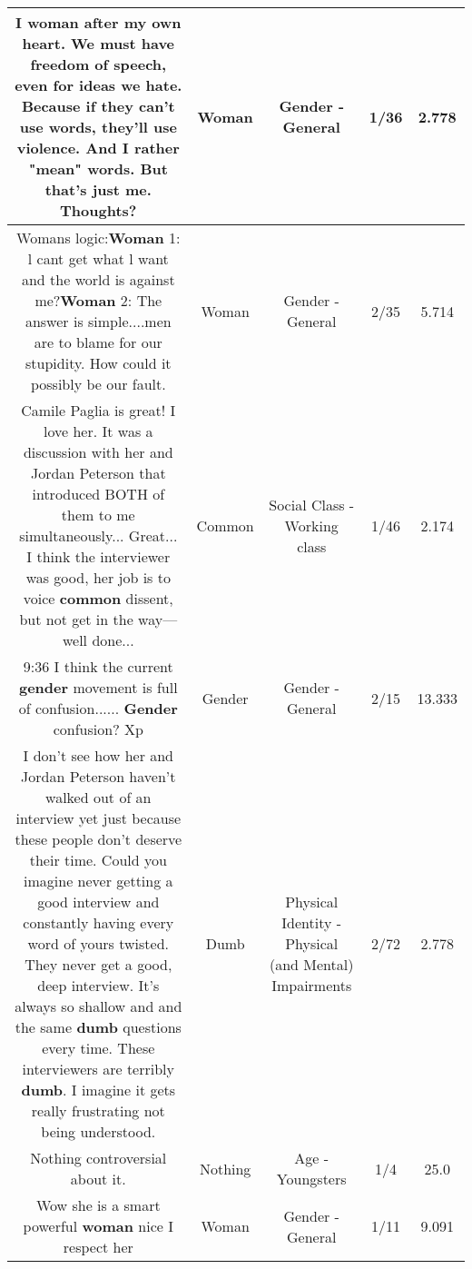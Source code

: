 \documentclass[11pt]{article}
\newlength\mylength
\begin{document}
\begin{center}
\begin{longtable}{|C{.65\mylength}|C{.30\mylength}|C{.12\mylength}|C{.12\mylength}|C{.12\mylength}|}
  \small I \textbf{woman} after my own heart. We must have freedom of speech, even for ideas we hate. Because if they can't use words, they'll use violence. And I rather "mean" words. But that's just me. Thoughts?\normalsize   & Woman & Gender - General & 1/36 & 2.778 \\  \hline
  \small Womans logic:\textbf{Woman} 1: l cant get what l want and the world is against me?\textbf{Woman} 2: The answer is simple....men are to blame for our stupidity.  How could it possibly be our fault.\normalsize   & Woman & Gender - General & 2/35 & 5.714 \\  \hline
  \small Camile Paglia is great! I love her. It was a discussion with her and Jordan Peterson that introduced BOTH of them to me simultaneously... Great... I think the interviewer was good, her job is to voice \textbf{common} dissent, but not get in the way— well done...\normalsize   & Common & Social Class - Working class & 1/46 & 2.174 \\  \hline
  \small 9:36 I think the current \textbf{gender} movement is full of confusion...... \textbf{Gender} confusion? Xp\normalsize   & Gender & Gender - General & 2/15 & 13.333 \\  \hline
  \small I don't see how her and Jordan Peterson haven't walked out of an interview yet just because these people don't deserve their time. Could you imagine never getting a good interview and constantly having every word of yours twisted. They never get a good, deep interview. It's always so shallow and and the same \textbf{dumb} questions every time. These interviewers are terribly \textbf{dumb}. I imagine it gets really frustrating not being understood.\normalsize   & Dumb & Physical Identity - Physical (and Mental) Impairments & 2/72 & 2.778 \\  \hline
  \small Nothing controversial about it.\normalsize   & Nothing & Age - Youngsters & 1/4 & 25.0 \\  \hline
  \small Wow she is a smart powerful \textbf{woman}  nice I respect her\normalsize   & Woman & Gender - General & 1/11 & 9.091 \\  \hline

\end{longtable}
\end{center}
\end{document}
